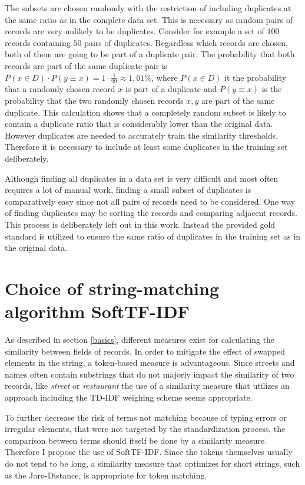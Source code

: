 \documentclass[conference]{IEEEtran}
\begin{document}
The subsets are chosen randomly with the restriction of including duplicates at the same ratio as in the complete data set. This is necessary as random pairs of records are very unlikely to be duplicates. Consider for example a set of $100$ records containing $50$ pairs of duplicates. Regardless which records are chosen, both of them are going to be part of a duplicate pair. The probability that both records are part of the same duplicate pair is $P(x \in D) \cdot P(y \equiv x) = 1 \cdot \frac{1}{99} \approx 1,01\%$, where $P(x \in D)$ it the probability that a randomly chosen record $x$ is part of a duplicate and $P(y \equiv x)$ is the probability that the two randomly chosen records $x,y$ are part of the same duplicate. This calculation shows that a completely random subset is likely to contain a duplicate ratio that is considerably lower than the original data. However duplicates are needed to accurately train the similarity thresholds. Therefore it is necessary to include at least some duplicates in the training set deliberately.

Although finding all duplicates in a data set is very difficult and most often requires a lot of manual work, finding a small subset of duplicates is comparatively easy since not all pairs of records need to be considered. One way of finding duplicates may be sorting the records and comparing adjacent records. This process is deliberately left out in this work. Instead the provided gold standard is utilized to ensure the same ratio of duplicates in the training set as in the original data.


\section{Choice of string-matching algorithm SoftTF-IDF}\label{matching}
As described in section \ref{basics}, different measures exist for calculating the similarity between fields of records. In order to mitigate the effect of swapped elements in the string, a token-based measure is advantageous.
Since streets and names often contain substrings that do not majorly impact the similarity of two records, like \emph{street} or \emph{restaurant} the use of a similarity measure that utilizes an approach including the TD-IDF weighing scheme seems appropriate.

To further decrease the risk of terms not matching because of typing errors or irregular elements, that were not targeted by the standardization process, the comparison between terms should itself be done by a similarity measure. Therefore I propose the use of SoftTF-IDF. Since the tokens themselves usually do not tend to be long, a similarity measure that optimizes for short strings, such as the Jaro-Distance, is appropriate for token matching.
\end{document}
